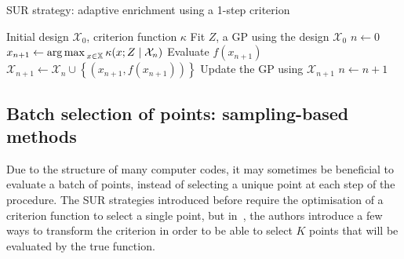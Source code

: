 \documentclass[../../Main_ManuscritThese.tex]{subfiles}
\begin{document}
\begin{algorithm}
  \caption{\label{alg:SUR_strat} SUR strategy: adaptive enrichment using a 1-step criterion}
\begin{algorithmic}
\REQUIRE Initial design $\mathcal{X}_0$, criterion function $\kappa$
\STATE Fit $Z$, a GP using the design $\mathcal{X}_0$
\STATE $n \leftarrow 0$
\STATE $x_{n+1} \leftarrow \operatorname*{arg\,max \,}_{x \in \mathbb{X}} \kappa(x; Z \mid \mathcal{X}_{n})$
\STATE Evaluate $f(x_{n+1})$
\STATE $\mathcal{X}_{n+1} \leftarrow \mathcal{X}_n \cup \left\{\left(x_{n+1}, f(x_{n+1})\right)\right\}$
\STATE Update the GP using $\mathcal{X}_{n+1}$
\STATE $n \leftarrow n + 1$
\ENDWHILE
\end{algorithmic}
\end{algorithm}


\subsection{Batch selection of points: sampling-based methods}
\label{sec:sampling_based_criterion}

Due to the structure of many computer codes, it may sometimes be
beneficial to evaluate a batch of points, instead of selecting a
unique point at each step of the procedure. The SUR strategies
introduced before require the optimisation of a criterion function to
select a single point, but in~\cite{ginsbourger_kriging_2010}, the
authors introduce a few ways to transform the criterion in order to be
able to select $K$ points that will be evaluated by the true function.
\end{document}
